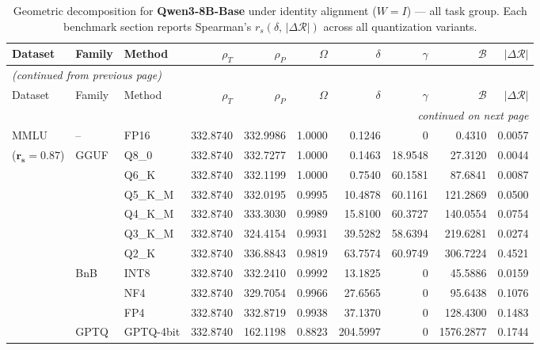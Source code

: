 \begingroup
\small
\setlength{\tabcolsep}{4pt}
\renewcommand{\arraystretch}{1.05}
\setlength{\LTcapwidth}{\textwidth}
\begin{longtable}{ll l rrrrrrr}
\caption{Geometric decomposition for \textbf{Qwen3-8B-Base} under identity alignment ($W{=}I$) --- all task group. Each benchmark section reports Spearman's $r_s(\delta,\,|\Delta\mathcal{R}|)$ across all quantization variants.}\label{tab:qwen_decomposition_all}\\
\toprule
Dataset & Family & Method & $\rho_T$ & $\rho_P$ & $\Omega$ & $\delta$ & $\gamma$ & $\mathcal{B}$ & $|\Delta\mathcal{R}|$ \\
\midrule
\endfirsthead
\multicolumn{10}{l}{\small\itshape (continued from previous page)}\\
\toprule
Dataset & Family & Method & $\rho_T$ & $\rho_P$ & $\Omega$ & $\delta$ & $\gamma$ & $\mathcal{B}$ & $|\Delta\mathcal{R}|$ \\
\midrule
\endhead
\midrule
\multicolumn{10}{r}{\small\itshape continued on next page}\\
\endfoot
\bottomrule
\endlastfoot
MMLU & -- & FP16 & 332.8740 & 332.9986 & 1.0000 & 0.1246 & \cellcolor{cyan!12} $0$ & 0.4310 & 0.0057 \\
{\small ($\mathbf{r_s{=}0.87}$)} & GGUF & Q8\_0 & 332.8740 & 332.7277 & 1.0000 & 0.1463 & 18.9548 & 27.3120 & 0.0044 \\
 &  & Q6\_K & 332.8740 & 332.1199 & 1.0000 & 0.7540 & 60.1581 & 87.6841 & 0.0087 \\
 &  & Q5\_K\_M & 332.8740 & 332.0195 & 0.9995 & 10.4878 & 60.1161 & 121.2869 & 0.0500 \\
 &  & Q4\_K\_M & 332.8740 & 333.3030 & 0.9989 & 15.8100 & 60.3727 & 140.0554 & 0.0754 \\
 &  & Q3\_K\_M & 332.8740 & 324.4154 & 0.9931 & 39.5282 & 58.6394 & 219.6281 & 0.0274 \\
 &  & Q2\_K & 332.8740 & 336.8843 & 0.9819 & 63.7574 & 60.9749 & 306.7224 & 0.4521 \\
 & BnB & INT8 & 332.8740 & 332.2410 & 0.9992 & 13.1825 & \cellcolor{cyan!12} $0$ & 45.5886 & 0.0159 \\
 &  & NF4 & 332.8740 & 329.7054 & 0.9966 & 27.6565 & \cellcolor{cyan!12} $0$ & 95.6438 & 0.1076 \\
 &  & FP4 & 332.8740 & 332.8719 & 0.9938 & 37.1370 & \cellcolor{cyan!12} $0$ & 128.4300 & 0.1483 \\
 & GPTQ & GPTQ-4bit & 332.8740 & 162.1198 & \cellcolor{red!18} 0.8823 & \cellcolor{red!18} 204.5997 & \cellcolor{cyan!12} $0$ & \cellcolor{red!18} 1576.2877 & \cellcolor{red!18} 0.1744 \\

\end{longtable}
